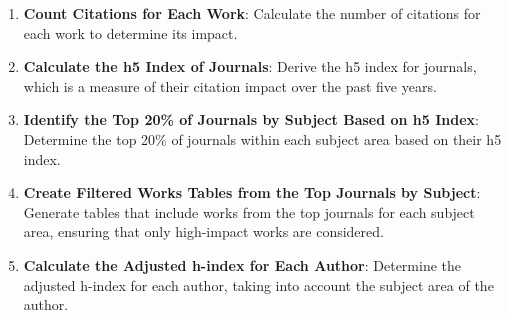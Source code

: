 %
\begin{enumerate}
      \item \textbf{Count Citations for Each Work}: Calculate the number of citations for each work to determine its impact.

      \item \textbf{Calculate the h5 Index of Journals}: Derive the h5 index for journals, which is a
            measure of their citation impact over the past five years.

      \item \textbf{Identify the Top 20\% of Journals by Subject Based on h5 Index}: Determine the top 20\% of journals within
            each subject area based on their h5 index.

      \item \textbf{Create Filtered Works Tables from the Top Journals by Subject}: Generate tables that include works from the
            top journals for each subject area, ensuring that only high-impact works are considered.


      \item \textbf{Calculate the Adjusted h-index for Each Author}: Determine the adjusted h-index for each author,
            taking into account the subject area of the author.
\end{enumerate}


